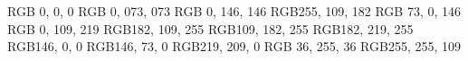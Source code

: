 \RequirePackage{etoolbox}
\RequirePackage{xcolor}


\definecolor{cb-black}      {RGB}{  0,   0,   0}
\definecolor{cb-blue-green} {RGB}{  0,  073,  073}
\definecolor{cb-green-sea}  {RGB}{  0, 146, 146}
\definecolor{cb-rose}       {RGB}{255, 109, 182}
\definecolor{cb-purple}     {RGB}{ 73,   0, 146}
\definecolor{cb-blue}       {RGB}{ 0, 109, 219}
\definecolor{cb-lilac}      {RGB}{182, 109, 255}
\definecolor{cb-blue-sky}   {RGB}{109, 182, 255}
\definecolor{cb-blue-light} {RGB}{182, 219, 255}
\definecolor{cb-burgundy}   {RGB}{146,   0,   0}
\definecolor{cb-brown}      {RGB}{146,  73,   0}
\definecolor{cb-clay}       {RGB}{219, 209,   0}
\definecolor{cb-green-lime} {RGB}{ 36, 255,  36}
\definecolor{cb-yellow}     {RGB}{255, 255, 109}

